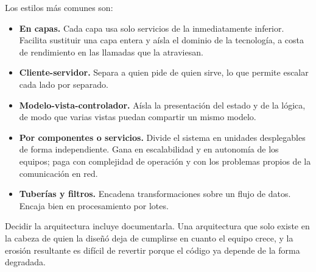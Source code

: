 Los estilos más comunes son:

\begin{itemize}
    \item \textbf{En capas.} Cada capa usa solo servicios de la inmediatamente
          inferior. Facilita sustituir una capa entera y aísla el dominio de la
          tecnología, a costa de rendimiento en las llamadas que la atraviesan.
    \item \textbf{Cliente-servidor.} Separa a quien pide de quien sirve, lo que
          permite escalar cada lado por separado.
    \item \textbf{Modelo-vista-controlador.} Aísla la presentación del estado y de
          la lógica, de modo que varias vistas puedan compartir un mismo modelo.
    \item \textbf{Por componentes o servicios.} Divide el sistema en unidades
          desplegables de forma independiente. Gana en escalabilidad y en
          autonomía de los equipos; paga con complejidad de operación y con los
          problemas propios de la comunicación en red.
    \item \textbf{Tuberías y filtros.} Encadena transformaciones sobre un flujo de
          datos. Encaja bien en procesamiento por lotes.
\end{itemize}

Decidir la arquitectura incluye documentarla. Una arquitectura que solo existe en
la cabeza de quien la diseñó deja de cumplirse en cuanto el equipo crece, y la
erosión resultante es difícil de revertir porque el código ya depende de la forma
degradada.
